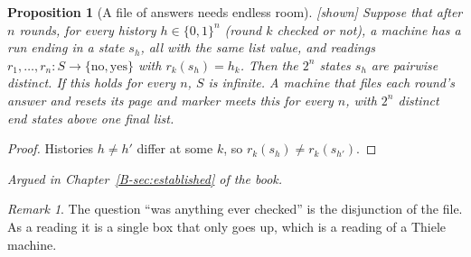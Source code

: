 \documentclass[11pt, a4paper]{article}
\theoremstyle{plain}
\newtheorem{proposition}[theorem]{Proposition}
\theoremstyle{definition}
\theoremstyle{remark}
\newtheorem{remark}[theorem]{Remark}
\newcommand{\Bool}{\{\mathrm{no},\mathrm{yes}\}}
\newcommand{\argued}[1]{\par\noindent\textit{Argued in Chapter~\ref{B-#1} of the book.}\par}
\newcommand{\kind}[1]{\textup{[#1]}}
\begin{document}
\begin{proposition}[A file of answers needs endless room]\label{spec:editions} \kind{shown}
Suppose that after $n$ rounds, for every history $h\in\{0,1\}^n$ (round $k$ checked or not), a machine has a
run ending in a state $s_h$, all with the same list value, and readings $r_1,\dots,r_n:S\to\Bool$ with
$r_k(s_h)=h_k$. Then the $2^n$ states $s_h$ are pairwise distinct. If this holds for every $n$, $S$ is
infinite. A machine that files each round's answer and resets its page and marker meets this for every $n$,
with $2^n$ distinct end states above one final list.
\end{proposition}
\begin{proof}
Histories $h\ne h'$ differ at some $k$, so $r_k(s_h)\ne r_k(s_{h'})$.
\end{proof}
\argued{sec:established}

\begin{remark}
The question ``was anything ever checked'' is the disjunction of the file. As a reading it is a single box
that only goes up, which is a reading of a Thiele machine.
\end{remark}
\end{document}

